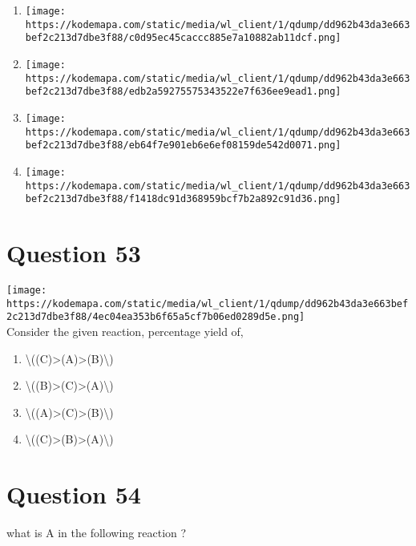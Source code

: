 \documentclass{article}
\begin{document}
\begin{enumerate}[label=(\alph*)]
\item \texttt{[image: https://kodemapa.com/static/media/wl\_client/1/qdump/dd962b43da3e663bef2c213d7dbe3f88/c0d95ec45caccc885e7a10882ab11dcf.png]}


\item \texttt{[image: https://kodemapa.com/static/media/wl\_client/1/qdump/dd962b43da3e663bef2c213d7dbe3f88/edb2a59275575343522e7f636ee9ead1.png]}


\item \texttt{[image: https://kodemapa.com/static/media/wl\_client/1/qdump/dd962b43da3e663bef2c213d7dbe3f88/eb64f7e901eb6e6ef08159de542d0071.png]}


\item \texttt{[image: https://kodemapa.com/static/media/wl\_client/1/qdump/dd962b43da3e663bef2c213d7dbe3f88/f1418dc91d368959bcf7b2a892c91d36.png]}


\end{enumerate}
\newpage
\section*{Question 53}
\texttt{[image: https://kodemapa.com/static/media/wl\_client/1/qdump/dd962b43da3e663bef2c213d7dbe3f88/4ec04ea353b6f65a5cf7b06ed0289d5e.png]}\\



Consider the given reaction, percentage yield of,~


\begin{enumerate}[label=(\alph*)]
\item \textbackslash((C)\textgreater(A)\textgreater(B)\textbackslash)


\item \textbackslash((B)\textgreater(C)\textgreater(A)\textbackslash)


\item \textbackslash((A)\textgreater(C)\textgreater(B)\textbackslash)


\item \textbackslash((C)\textgreater(B)\textgreater(A)\textbackslash)


\end{enumerate}
\newpage
\section*{Question 54}
what is A in the following reaction ?
\end{document}
